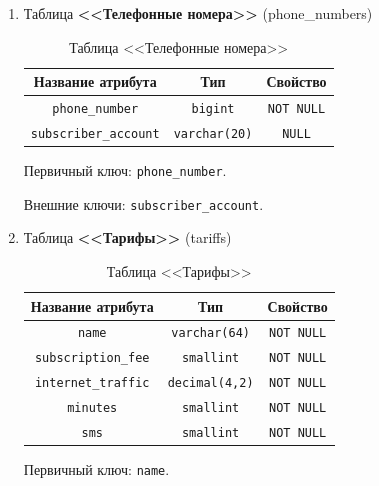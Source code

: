 

\begin{enumerate}
    \item Таблица \textbf{<<Телефонные номера>>} (phone\_numbers)
    
    \renewcommand{\arraystretch}{1.5}
    \begin{xltabular}[h]{\textwidth}{|C|C|C|}
        \caption{Таблица <<Телефонные номера>>} \\
        \hline
        \textbf{Название атрибута}   & \textbf{Тип}         & \textbf{Свойство} \\
        \hline \endhead
        \texttt{phone\_number}       & \texttt{bigint}      & \texttt{NOT NULL} \\
        \hline
        \texttt{subscriber\_account} & \texttt{varchar(20)} & \texttt{NULL}     \\
        \hline
    \end{xltabular}

    \tab Первичный ключ: \texttt{phone\_number}.

    \tab Внешние ключи: \texttt{subscriber\_account}.


    \item Таблица \textbf{<<Тарифы>>} (tariffs)
    
    \renewcommand{\arraystretch}{1.5}
    \begin{xltabular}[h]{\textwidth}{|C|C|C|}
        \caption{Таблица <<Тарифы>>} \\
        \hline
        \textbf{Название атрибута}  & \textbf{Тип}          & \textbf{Свойство} \\
        \hline \endhead
        \texttt{name}               & \texttt{varchar(64)}  & \texttt{NOT NULL} \\
        \hline
        \texttt{subscription\_fee}  & \texttt{smallint}     & \texttt{NOT NULL} \\
        \hline
        \texttt{internet\_traffic}  & \texttt{decimal(4,2)} & \texttt{NOT NULL} \\
        \hline
        \texttt{minutes}            & \texttt{smallint}     & \texttt{NOT NULL} \\
        \hline
        \texttt{sms}                & \texttt{smallint}     & \texttt{NOT NULL} \\
        \hline
    \end{xltabular}

    \tab Первичный ключ: \texttt{name}.
   


\end{enumerate}
